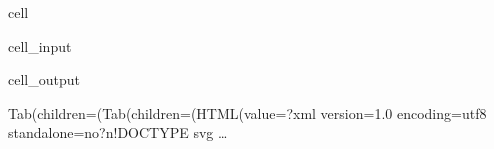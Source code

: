 \documentclass[letterpaper,10pt,english]{jupyterBook}
\begin{document}
\begin{sphinxuseclass}{cell}\begin{sphinxVerbatimInput}

\begin{sphinxuseclass}{cell_input}
\begin{sphinxVerbatim}[commandchars=\\\{\}]
\PYG{p}{[}\PYG{p}{]}
\end{sphinxVerbatim}

\end{sphinxuseclass}\end{sphinxVerbatimInput}
\begin{sphinxVerbatimOutput}

\begin{sphinxuseclass}{cell_output}
\begin{sphinxVerbatim}[commandchars=\\\{\}]
Tab(children=(Tab(children=(HTML(value=\PYGZsq{}\PYGZlt{}?xml version=\PYGZdq{}1.0\PYGZdq{} encoding=\PYGZdq{}utf\PYGZhy{}8\PYGZdq{} standalone=\PYGZdq{}no\PYGZdq{}?\PYGZgt{}\PYGZbs{}n\PYGZlt{}!DOCTYPE svg …
\end{sphinxVerbatim}

\begin{sphinxVerbatim}[commandchars=\\\{\}]

\end{sphinxVerbatim}

\end{sphinxuseclass}\end{sphinxVerbatimOutput}

\end{sphinxuseclass}
\end{document}
